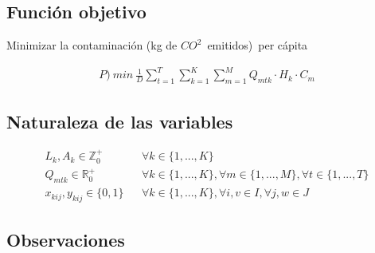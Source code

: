 \documentclass[letterpaper]{article}
\begin{document}



\subsection{Función objetivo}
\noindent
Minimizar la contaminación (kg de $CO^{2}$\ emitidos)\ per cápita

\begin{gather*}
	P)\ min\ \frac{1}{D} \sum_{t=1}^{T}\sum_{k=1}^{K}\sum_{m=1}^{M} Q_{mtk} \cdot H_{k} \cdot C_{m}
\end{gather*}

\subsection{Naturaleza de las variables}
\begin{align}
	L_{k}, A_{k} \in \mathbb{Z}_{0}^{+} && \forall k \in \{1,...,K\}\\
	Q_{mtk} \in \mathbb{R}_{0}^{+} && \forall k \in \{1,...,K\}, \forall m \in \{1,...,M\}, \forall t \in \{1,...,T\}\\ 
	x_{kij}, y_{kij} \in \{0,1\} && \forall k \in \{1,...,K\}, \forall i,v \in I, \forall j,w \in J
\end{align}
\subsection{Observaciones}
\end{document}
